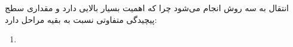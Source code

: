 انتقال به سه روش انجام می‌شود چرا که اهمیت بسیار بالایی دارد و مقداری سطج
پیچیدگی متفاوتی نسبت به بقیه مراحل دارد:

\begin{enumerate}
    \item 
\end{enumerate}











